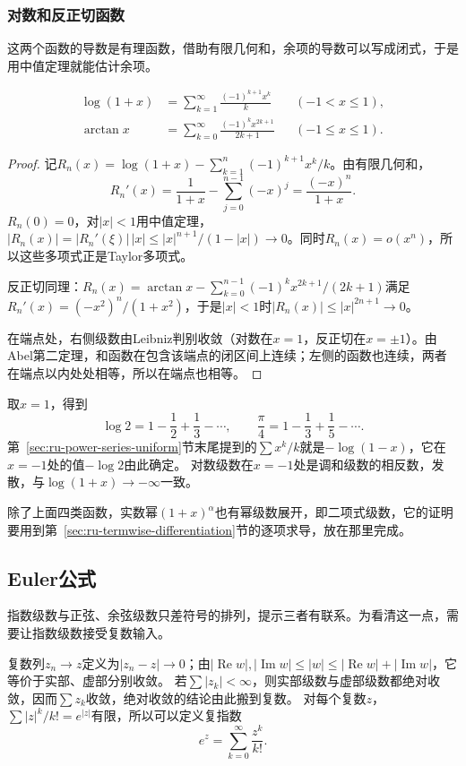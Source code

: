 \subsubsection{对数和反正切函数}
\label{sec:ru-taylor-log-arctan}
这两个函数的导数是有理函数，借助有限几何和，余项的导数可以写成闭式，于是用中值定理就能估计余项。
\begin{theorem}[对数和反正切函数的展开]
\label{thm:ru-log-arctan-series}
\[
 \begin{aligned}
 \log(1+x)&=\sum_{k=1}^\infty\frac{(-1)^{k+1}x^k}{k}&&(-1<x\leq1),\\
 \arctan x&=\sum_{k=0}^\infty\frac{(-1)^kx^{2k+1}}{2k+1}&&(-1\leq x\leq1).
 \end{aligned}
\]
\end{theorem}
\begin{proof}
记$R_n(x)=\log(1+x)-\sum_{k=1}^n(-1)^{k+1}x^k/k$。由有限几何和，
\[
 R_n'(x)=\frac1{1+x}-\sum_{j=0}^{n-1}(-x)^j=\frac{(-x)^n}{1+x}.
\]
$R_n(0)=0$，对$|x|<1$用中值定理，$|R_n(x)|=|R_n'(\xi)|\,|x|\leq|x|^{n+1}/(1-|x|)\to0$。同时$R_n(x)=o(x^n)$，所以这些多项式正是Taylor多项式。

反正切同理：$R_n(x)=\arctan x-\sum_{k=0}^{n-1}(-1)^kx^{2k+1}/(2k+1)$满足$R_n'(x)=(-x^2)^n/(1+x^2)$，于是$|x|<1$时$|R_n(x)|\leq|x|^{2n+1}\to0$。

在端点处，右侧级数由Leibniz判别收敛（对数在$x=1$，反正切在$x=\pm1$）。由Abel第二定理，和函数在包含该端点的闭区间上连续；左侧的函数也连续，两者在端点以内处处相等，所以在端点也相等。
\end{proof}
取$x=1$，得到
\[
 \log2=1-\frac12+\frac13-\cdots,\qquad\frac\pi4=1-\frac13+\frac15-\cdots.
\]
第~\ref{sec:ru-power-series-uniform}节末尾提到的$\sum x^k/k$就是$-\log(1-x)$，它在$x=-1$处的值$-\log2$由此确定。
对数级数在$x=-1$处是调和级数的相反数，发散，与$\log(1+x)\to-\infty$一致。

除了上面四类函数，实数幂$(1+x)^\alpha$也有幂级数展开，即二项式级数，它的证明要用到第~\ref{sec:ru-termwise-differentiation}节的逐项求导，放在那里完成。

\subsection{Euler公式}
\label{sec:ru-euler-formula}
\label{sec:ru-trig-expansion-complex-exponential}

指数级数与正弦、余弦级数只差符号的排列，提示三者有联系。为看清这一点，需要让指数级数接受复数输入。

复数列$z_n\to z$定义为$|z_n-z|\to0$；由$|\operatorname{Re}w|,|\operatorname{Im}w|\leq|w|\leq|\operatorname{Re}w|+|\operatorname{Im}w|$，它等价于实部、虚部分别收敛。
若$\sum|z_k|<\infty$，则实部级数与虚部级数都绝对收敛，因而$\sum z_k$收敛，绝对收敛的结论由此搬到复数。
对每个复数$z$，$\sum|z|^k/k!=e^{|z|}$有限，所以可以定义复指数
\[
 e^z=\sum_{k=0}^\infty\frac{z^k}{k!}.
\]

